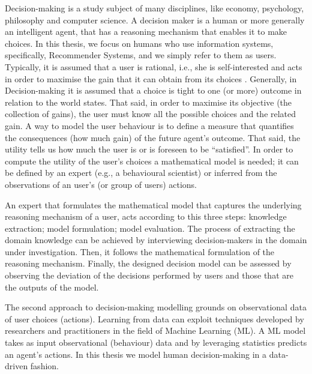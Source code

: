 Decision-making is a study subject of many disciplines, like economy, psychology, philosophy and computer science. A decision maker is a human or more generally an intelligent agent, that has a reasoning mechanism that enables it to make choices. 
In this thesis, we focus on humans who use information systems, specifically, Recommender Systems, and we simply refer to them as users.
Typically, it is assumed that a user is rational, i.e., she is self-interested and acts in order to maximise the gain 
that it can obtain from its choices \cite{decisionmaking:Kahneman,rational:utility:def}.
Generally, in Decision-making it is assumed that a choice is tight to one (or more) outcome in relation to the world states.
That said, in order to maximise its objective (the collection of gains), the user must know all the possible choices and the related gain. 
A way to model the user  
behaviour is to define a measure that quantifies the consequences (how much gain)
of the future agent's outcome. 
That said, the utility tells us how much the user is or is foreseen to be ``satisfied''. 
In order to compute the utility of the user's choices a mathematical model is needed; it can be defined by an expert (e.g., a behavioural scientist) or inferred from the observations of an user's (or group of users) actions.

An expert that formulates the mathematical model that captures the underlying reasoning mechanism of a user, acts according to this three steps: knowledge extraction; model formulation; model evaluation. The process of extracting the domain knowledge can be achieved by interviewing decision-makers in the domain under investigation. Then, it follows the mathematical formulation of the reasoning mechanism. Finally, the designed decision model can be assessed by observing the deviation of the decisions performed by users and those that are the outputs of the model.

The second approach to decision-making modelling grounds on observational data of user choices (actions).
Learning from data can exploit techniques developed by researchers and practitioners in the field of Machine Learning (ML). A ML model takes as input observational (behaviour) data and by leveraging statistics
predicts an agent's actions. In this thesis we model human decision-making in a data-driven fashion. 

